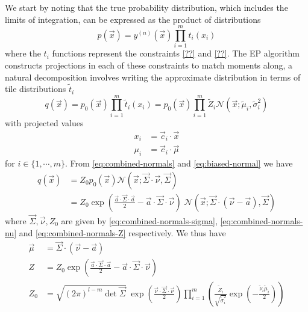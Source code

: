 \documentclass[11pt,twoside]{report}
\begin{document}
We start by noting that the true probability distribution, which includes the limits of integration, can be expressed as the product of distributions
\begin{equation}
  p(\vec{x})
  = y^{(n)}(\vec{x}) \prod_{i=1}^{m} t_i (x_i)
\end{equation}
where the $t_i$ functions represent the constraints \eqref{??} and \eqref{??}.
The EP algorithm constructs projections in each of these constraints to match moments along, a natural decomposition involves writing the approximate distribution in terms of tile distributions $\tilde{t}_i$
\begin{equation}
  q(\vec{x})
  = p_0(\vec{x}) \prod_{i=1}^{m} \tilde{t}_i (x_i)
  = p_0(\vec{x}) \prod_{i=1}^{m} \tilde{Z}_i \mathcal{N}(\vec{x}; \tilde{\mu}_i, \tilde{\sigma}_i^2)
\end{equation}
with projected values
\begin{subequations}
  \begin{align}
    x_i &= \vec{c}_i \cdot \vec{x} \\
    \mu_i &= \vec{c}_i \cdot \vec{\mu}
  \end{align}
\end{subequations}
for $i \in \{1,\cdots,m\}$.
From \eqref{eq:combined-normals} and \eqref{eq:biased-normal} we have
\begin{equation}
  \begin{split}
    q(\vec{x}) &=
    Z_0
    p_0(\vec{x})
    \mathcal{N}(\vec{x}; \vec{\Sigma} \cdot \vec{\nu}, \vec{\Sigma}) \\
    &=
    Z_0
    \exp{\left( \frac{\vec{a} \cdot \vec{\Sigma} \cdot \vec{a}}{2} - \vec{a} \cdot \vec{\Sigma} \cdot{\vec{\nu}} \right)} \;
    \mathcal{N}(\vec{x}; \vec{\Sigma} \cdot (\vec{\nu} - \vec{a}), \vec{\Sigma})
  \end{split}
\end{equation}
where $\vec{\Sigma}, \vec{\nu}, Z_0$ are given by \eqref{eq:combined-normals-sigma}, \eqref{eq:combined-normals-nu} and \eqref{eq:combined-normals-Z} respectively.
We thus have
\begin{subequations}
  \begin{align}
    \vec{\mu} &= \vec{\Sigma} \cdot (\vec{\nu} - \vec{a})
    \\
    Z &= Z_0
    \exp{\left( \frac{\vec{a} \cdot \vec{\Sigma} \cdot \vec{a}}{2} - \vec{a} \cdot \vec{\Sigma} \cdot \vec{\nu} \right)}
    \\
    Z_0 &=
    \sqrt{ (2\pi)^{l-m} \det{\vec{\Sigma}} }
    \;
    \exp{\left( \frac{\vec{\nu} \cdot \vec{\Sigma} \cdot \vec{\nu}}{2} \right)}
    \prod_{i=1}^m
    \left(
    \frac{\tilde{Z}_i}{\sqrt{ \tilde{\sigma}_i^2 }}
    \exp{\left(-\frac{\tilde{\nu}_i \tilde{\mu}_i}{2}\right)}
    \right)
  \end{align}
\end{subequations}
\end{document}
